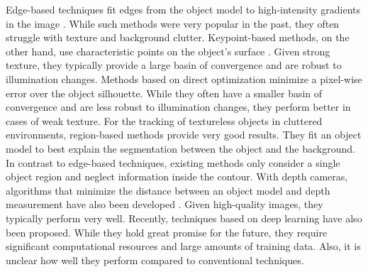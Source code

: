 \documentclass[letterpaper, 10 pt, conference]{ieeeconf}
\begin{document}
Edge-based techniques fit edges from the object model to high-intensity gradients in the image \cite{Harris1990, Bugaev2018}.
While such methods were very popular in the past, they often struggle with texture and background clutter.
Keypoint-based methods, on the other hand, use characteristic points on the object’s surface \cite{Vacchetti2004, Lourakis2013}.
Given strong texture, they typically provide a large basin of convergence and are robust to illumination changes.
Methods based on direct optimization \cite{Crivellaro2014, Zhong2019} minimize a pixel-wise error over the object silhouette.
While they often have a smaller basin of convergence and are less robust to illumination changes, they perform better in cases of weak texture.
For the tracking of textureless objects in cluttered environments, region-based methods \cite{Prisacariu2012, Stoiber2021} provide very good results.
They fit an object model to best explain the segmentation between the object and the background.
In contrast to edge-based techniques, existing methods only consider a single object region and neglect information inside the contour.
With depth cameras, algorithms that minimize the distance between an object model and depth measurement have also been developed \cite{Schmidt2015a, Krainin2011}.
Given high-quality images, they typically perform very well.
Recently, techniques based on deep learning \cite{Wen2020, Deng2021} have also been proposed.
While they hold great promise for the future, they require significant computational resources and large amounts of training data.
Also, it is unclear how well they perform compared to conventional techniques.
\end{document}
